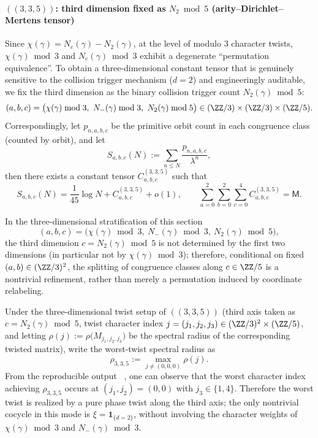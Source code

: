 \label{subsec:arity-dirichlet-mertens-tensor-part2}
\paragraph{\texorpdfstring{$((3,3,5))$}{(3,3,5)}: third dimension fixed as \texorpdfstring{$N_2\bmod 5$}{N2 mod 5} (arity--Dirichlet--Mertens tensor)}
Since $\chi(\gamma)=N_e(\gamma)-N_2(\gamma)$, at the level of modulo $3$ character twists, $\chi(\gamma)\bmod 3$ and $N_e(\gamma)\bmod 3$ exhibit a degenerate ``permutation equivalence''. To obtain a three-dimensional constant tensor that is genuinely sensitive to the collision trigger mechanism ($d=2$) and engineeringly auditable, we fix the third dimension as the binary collision trigger count
\(
N_2(\gamma)\bmod 5
\):
$$
(a,b,c)=\bigl(\chi(\gamma)\bmod 3,\ N_-(\gamma)\bmod 3,\ N_2(\gamma)\bmod 5\bigr)\in(\ZZ/3)\times(\ZZ/3)\times(\ZZ/5).
$$
Correspondingly, let $p_{n,a,b,c}$ be the primitive orbit count in each congruence class (counted by orbit), and let
$$
S_{a,b,c}(N):=\sum_{n\le N}\frac{p_{n,a,b,c}}{\lambda^n},
$$
then there exists a constant tensor $C^{(3,3,5)}_{a,b,c}$ such that
$$
S_{a,b,c}(N)=\frac{1}{45}\log N + C^{(3,3,5)}_{a,b,c}+o(1),
\qquad
\sum_{a=0}^2\sum_{b=0}^2\sum_{c=0}^4 C^{(3,3,5)}_{a,b,c}=\mathsf{M}.
$$
\begin{remark}\label{prop:arity-335-n2-nondegenerate}
In the three-dimensional stratification of this section
$$
(a,b,c)=\bigl(\chi(\gamma)\bmod 3,\ N_-(\gamma)\bmod 3,\ N_2(\gamma)\bmod 5\bigr),
$$
the third dimension $c=N_2(\gamma)\bmod 5$ is not determined by the first two dimensions (in particular not by $\chi(\gamma)\bmod 3$); therefore, conditional on fixed $(a,b)\in(\ZZ/3)^2$, the splitting of congruence classes along $c\in\ZZ/5$ is a nontrivial refinement, rather than merely a permutation induced by coordinate relabeling.
\end{remark}

\begin{remark}\label{prop:arity-335-collision-dominant}
Under the three-dimensional twist setup of \(((3,3,5))\) (third axis taken as $c=N_2(\gamma)\bmod 5$, twist character index $j=(j_1,j_2,j_3)\in(\ZZ/3)^2\times(\ZZ/5)$, and letting
\(
\rho(j):=\rho\bigl(M_{j_1,j_2,j_3}\bigr)
\)
be the spectral radius of the corresponding twisted matrix), write the worst-twist spectral radius as
$$
\rho_{3,3,5}:=\max_{j\neq (0,0,0)}\rho(j).
$$
From the reproducible output
\verb||\ ,
one can observe that the worst character index achieving $\rho_{3,3,5}$ occurs at $(j_1,j_2)=(0,0)$ with $j_3\in\{1,4\}$. Therefore the worst twist is realized by a pure phase twist along the third axis; the only nontrivial cocycle in this mode is
\(
\xi=\mathbf{1}_{\{d=2\}}
\), without involving the character weights of $\chi(\gamma)\bmod 3$ and $N_-(\gamma)\bmod 3$.
\end{remark}

